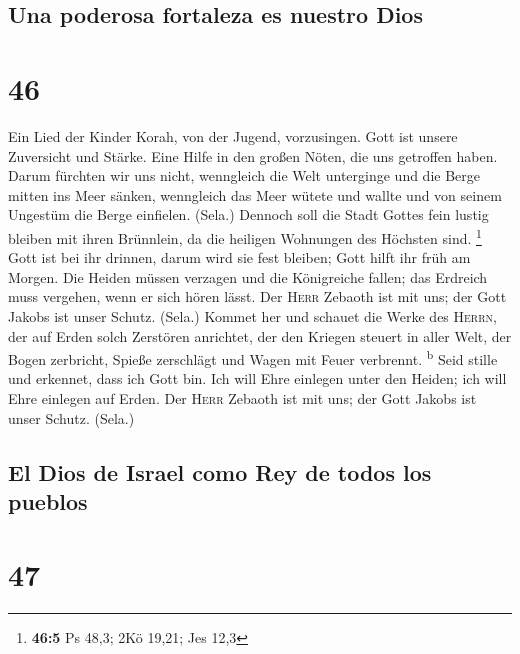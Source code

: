 \hypertarget{una-poderosa-fortaleza-es-nuestro-dios}{%
\subsection{Una poderosa fortaleza es nuestro
Dios}\label{una-poderosa-fortaleza-es-nuestro-dios}}

\hypertarget{section-45}{%
\section{46}\label{section-45}}

 Ein Lied der Kinder Korah, von der Jugend, vorzusingen.
 Gott ist unsere Zuversicht und Stärke. Eine Hilfe in den
großen Nöten, die uns getroffen haben.  Darum fürchten wir
uns nicht, wenngleich die Welt unterginge und die Berge mitten ins Meer
sänken,  wenngleich das Meer wütete und wallte und von
seinem Ungestüm die Berge einfielen. (Sela.)  Dennoch soll
die Stadt Gottes fein lustig bleiben mit ihren Brünnlein, da die
heiligen Wohnungen des Höchsten sind. \footnote{\textbf{46:5} Ps 48,3;
  2Kö 19,21; Jes 12,3}  Gott ist bei ihr drinnen, darum
wird sie fest bleiben; Gott hilft ihr früh am Morgen.  Die
Heiden müssen verzagen und die Königreiche fallen; das Erdreich muss
vergehen, wenn er sich hören lässt.  Der \textsc{Herr}
Zebaoth ist mit uns; der Gott Jakobs ist unser Schutz. (Sela.)
 Kommet her und schauet die Werke des \textsc{Herrn}, der
auf Erden solch Zerstören anrichtet,  der den Kriegen
steuert in aller Welt, der Bogen zerbricht, Spieße zerschlägt und Wagen
mit Feuer verbrennt. \textsuperscript{b}  Seid stille und
erkennet, dass ich Gott bin. Ich will Ehre einlegen unter den Heiden;
ich will Ehre einlegen auf Erden.  Der \textsc{Herr}
Zebaoth ist mit uns; der Gott Jakobs ist unser Schutz. (Sela.)

\hypertarget{el-dios-de-israel-como-rey-de-todos-los-pueblos}{%
\subsection{El Dios de Israel como Rey de todos los
pueblos}\label{el-dios-de-israel-como-rey-de-todos-los-pueblos}}

\hypertarget{section-46}{%
\section{47}\label{section-46}}

